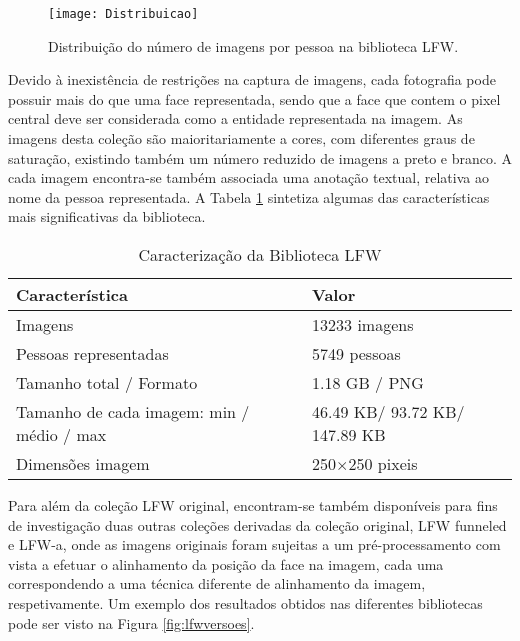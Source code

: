 \begin{figure}[ht]
  \begin{center}
    \leavevmode
    \texttt{[image: Distribuicao]}
    \caption{Distribuição do número de imagens por pessoa na biblioteca LFW.}
    \label{fig:distribuicaoLFW}
  \end{center}
\end{figure}

Devido à inexistência de restrições na captura de imagens, cada fotografia pode possuir mais do que uma face representada, sendo que a face que contem o pixel central deve ser considerada como a entidade representada na imagem. As imagens desta coleção são maioritariamente a cores, com diferentes graus de saturação, existindo também um número reduzido de imagens a preto e branco. A cada imagem encontra-se também associada uma anotação textual, relativa ao nome da pessoa representada. A Tabela \ref{tab:lfw} sintetiza algumas das características mais significativas da biblioteca.

\begin{center}
\begin{table}
	\caption{Caracterização da Biblioteca LFW}
	\begin{center}
    \begin{tabular}{ll}
    \hline
    Característica                            & Valor            \\ \hline
    Imagens                                   & 13233 imagens    \\
    Pessoas representadas                     & 5749 pessoas     \\
    Tamanho total / Formato                   & 1.18 GB / PNG     \\
    Tamanho de cada imagem: min / médio / max & 46.49 KB/ 93.72 KB/ 147.89 KB\\
    Dimensões imagem                          & 250$\times$250 pixeis \\
    \hline
    \end{tabular}
	\label{tab:lfw}
	\end{center}
\end{table}
\end{center}

Para além da coleção LFW original, encontram-se também disponíveis para fins de investigação duas outras coleções derivadas da coleção original, LFW funneled e LFW-a, onde as imagens originais foram sujeitas a um pré-processamento com vista a efetuar o alinhamento da posição da face na imagem, cada uma correspondendo a uma técnica diferente de alinhamento da imagem, respetivamente. Um exemplo dos resultados obtidos nas diferentes bibliotecas pode ser visto na Figura \ref{fig:lfwversoes}.

